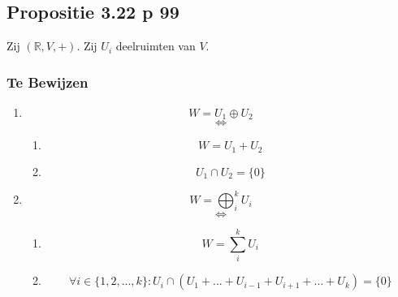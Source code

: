 \documentclass[lineaire_algebra_oplossingen.tex]{subfiles}
\begin{document}
\subsection{Propositie 3.22 p 99}
\label{3.22}
Zij $(\mathbb{R},V,+)$. Zij $U_i$ deelruimten van $V$.

\subsubsection*{Te Bewijzen}
\begin{enumerate}
\item
\[
W = U_1 \oplus U_2
\]
\[\Leftrightarrow\]
\begin{enumerate}
\item
\[
W = U_1 + U_2
\]
\item
\[
U_1\cap U_2 = \{0\}
\]
\end{enumerate}
\item
\[
W = \bigoplus_{i}^kU_i
\]
\[\Leftrightarrow\]
\begin{enumerate}
\item
\[
W = \sum_i^k U_i
\]
\item
\[
\forall i \in \{1,2,...,k\}: U_i \cap (U_1+...+U_{i-1}+U_{i+1}+...+U_k)=\{0\}
\]
\end{enumerate}
\end{enumerate}
\end{document}
